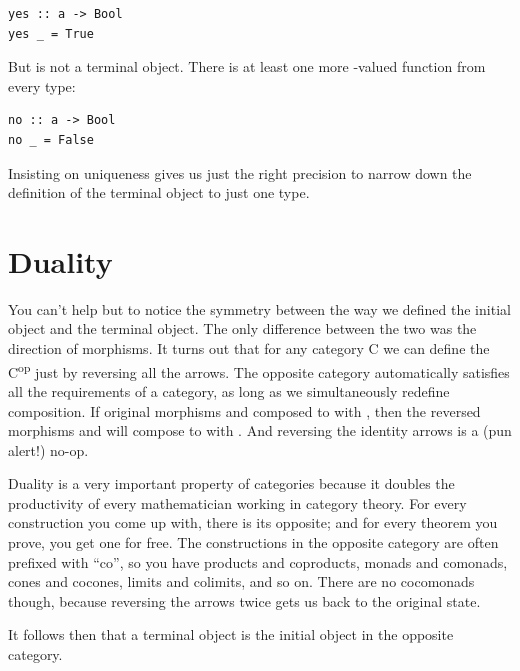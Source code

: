 \begin{Verbatim}[commandchars=\\\{\}]
yes :: a -> Bool
yes _ = True
\end{Verbatim}
But  is not a terminal object. There is at least one more
-valued function from every type:

\begin{Verbatim}[commandchars=\\\{\}]
no :: a -> Bool
no _ = False
\end{Verbatim}
Insisting on uniqueness gives us just the right precision to narrow down
the definition of the terminal object to just one type.

\section{Duality}\label{duality}

You can't help but to notice the symmetry between the way we defined the
initial object and the terminal object. The only difference between the
two was the direction of morphisms. It turns out that for any category C
we can define the  C\textsuperscript{op} just by
reversing all the arrows. The opposite category automatically satisfies
all the requirements of a category, as long as we simultaneously
redefine composition. If original morphisms
 and  composed
to  with , then the reversed
morphisms  and
 will compose to
 with . And reversing
the identity arrows is a (pun alert!) no-op.

Duality is a very important property of categories because it doubles
the productivity of every mathematician working in category theory. For
every construction you come up with, there is its opposite; and for
every theorem you prove, you get one for free. The constructions in the
opposite category are often prefixed with ``co'', so you have products
and coproducts, monads and comonads, cones and cocones, limits and
colimits, and so on. There are no cocomonads though, because reversing
the arrows twice gets us back to the original state.

It follows then that a terminal object is the initial object in the
opposite category.


